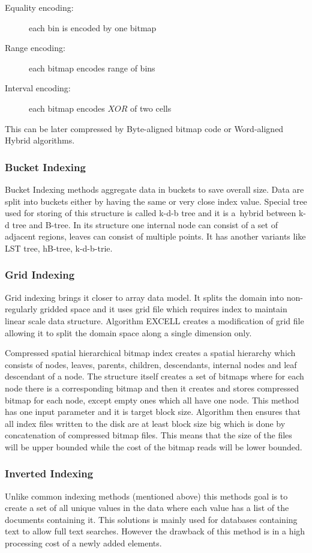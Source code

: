 \begin{description}
\item[Equality encoding:] each bin is encoded by one bitmap
\item[Range encoding: ] each bitmap encodes range of bins
\item[Interval encoding: ] each bitmap encodes $XOR$ of two cells
\end{description}

This can be later compressed by Byte-aligned bitmap code or Word-aligned Hybrid algorithms. 
\subsubsection{Bucket Indexing}
Bucket Indexing methods aggregate data in buckets to save overall size. Data are split into buckets either by having the same or very close index value. Special tree used for storing of this structure is called k-d-b tree and it is a~hybrid between k-d tree and B-tree. In its structure one internal node can consist of a set of adjacent regions, leaves can consist of multiple points. It has another variants like LST tree, hB-tree, k-d-b-trie.

\subsubsection{Grid Indexing}
Grid indexing brings it closer to array data model. It splits the domain into non-regularly gridded space and it uses grid file which requires index to maintain linear scale data structure. Algorithm EXCELL creates a modification of grid file allowing it to split the domain space along a single dimension only.

Compressed spatial hierarchical bitmap index \cite{cSHB} creates a spatial hierarchy which consists of nodes, leaves, parents, children, descendants, internal nodes and leaf descendant of a node. The structure itself creates a set of bitmaps where for each node there is a corresponding bitmap and then it creates and stores compressed bitmap for each node, except empty ones which all have one node. This method has one input parameter and it is target block size. Algorithm then ensures that all index files written to the disk are at least block size big which is done by concatenation of compressed bitmap files. This means that the size of the files will be upper bounded while the cost of the bitmap reads will be lower bounded.

\subsubsection{Inverted Indexing}
Unlike common indexing methods (mentioned above) this methods goal is to create a set of all unique values in the data where each value has a list of the documents containing it. This solutions is mainly used for databases containing text to allow full text searches. However the drawback of this method is in a high processing cost of a newly added elements. \cite{invertIndex}

